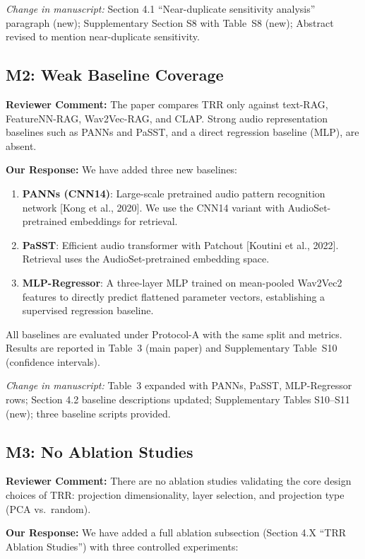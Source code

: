 \documentclass[11pt]{article}
\newcommand{\reviewer}[1]{\textcolor{reviewercolor}{\textbf{Reviewer Comment:} #1}}
\newcommand{\response}[1]{\textcolor{responsecolor}{\textbf{Our Response:} #1}}
\newcommand{\change}[1]{\textit{Change in manuscript:} #1}
\begin{document}
\change{Section 4.1 ``Near-duplicate sensitivity analysis'' paragraph (new); Supplementary Section S8 with Table~S8 (new); Abstract revised to mention near-duplicate sensitivity.}

\subsection*{M2: Weak Baseline Coverage}

\reviewer{The paper compares TRR only against text-RAG, FeatureNN-RAG, Wav2Vec-RAG, and CLAP. Strong audio representation baselines such as PANNs and PaSST, and a direct regression baseline (MLP), are absent.}

\response{We have added three new baselines:}

\begin{enumerate}[leftmargin=*]
\item \textbf{PANNs (CNN14)}: Large-scale pretrained audio pattern recognition network [Kong et al., 2020]. We use the CNN14 variant with AudioSet-pretrained embeddings for retrieval.
\item \textbf{PaSST}: Efficient audio transformer with Patchout [Koutini et al., 2022]. Retrieval uses the AudioSet-pretrained embedding space.
\item \textbf{MLP-Regressor}: A three-layer MLP trained on mean-pooled Wav2Vec2 features to directly predict flattened parameter vectors, establishing a supervised regression baseline.
\end{enumerate}

All baselines are evaluated under Protocol-A with the same split and metrics. Results are reported in Table~3 (main paper) and Supplementary Table~S10 (confidence intervals).

\change{Table~3 expanded with PANNs, PaSST, MLP-Regressor rows; Section 4.2 baseline descriptions updated; Supplementary Tables S10--S11 (new); three baseline scripts provided.}

\subsection*{M3: No Ablation Studies}

\reviewer{There are no ablation studies validating the core design choices of TRR: projection dimensionality, layer selection, and projection type (PCA vs.\ random).}

\response{We have added a full ablation subsection (Section 4.X ``TRR Ablation Studies'') with three controlled experiments:}
\end{document}
